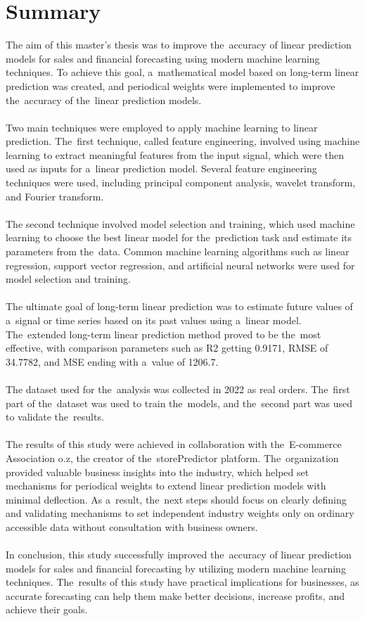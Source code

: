 
\chapter{Summary} \label{summary}
The aim of this master's thesis was to improve the~accuracy of linear prediction models for sales
and financial forecasting using modern machine learning techniques. To achieve this goal, a~mathematical
model based on long-term linear prediction was created, and periodical weights were implemented
to improve the~accuracy of the~linear prediction models.\\
\\
Two main techniques were employed to apply machine learning to linear prediction. The~first technique,
called feature engineering, involved using machine learning to extract meaningful features from
the input signal, which were then used as inputs for a~linear prediction model. Several feature
engineering techniques were used, including principal component analysis, wavelet transform, and
Fourier transform.\\
\\
The second technique involved model selection and training, which used machine learning to choose
the best linear model for the~prediction task and estimate its parameters from the~data. Common machine
learning algorithms such as linear regression, support vector regression, and artificial neural networks
were used for model selection and training.\\
\\
The ultimate goal of long-term linear prediction was to estimate future values of a~signal or time
series based on its past values using a~linear model. The~extended long-term linear prediction method
proved to be the~most effective, with comparison parameters such as R2 getting 0.9171, RMSE of 34.7782, and MSE ending
with a~value of 1206.7.\\
\\
The dataset used for the~analysis was collected in 2022 as real orders. The~first part of the~dataset
was used to train the~models, and the~second part was used to validate the~results.\\
\\
The results of this study were achieved in collaboration with the~E-commerce Association o.z,
the creator of the~storePredictor platform. The~organization provided valuable business insights into
the industry, which helped set mechanisms for periodical weights to extend linear prediction models
with minimal deflection. As a~result, the~next steps should focus on clearly defining and validating
mechanisms to set independent industry weights only on ordinary accessible data without consultation
with business owners.\\
\\
In conclusion, this study successfully improved the~accuracy of linear prediction models for sales
and financial forecasting by utilizing modern machine learning techniques. The~results of this study
have practical implications for businesses, as accurate forecasting can help them make better decisions,
increase profits, and achieve their goals.


